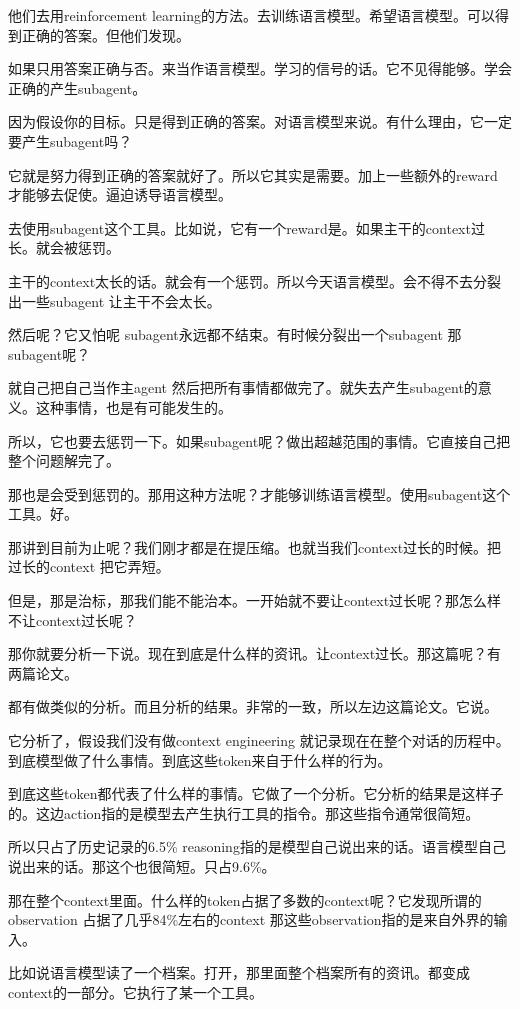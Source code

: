 \documentclass[12pt,a4paper]{article}
\begin{document}
他们去用reinforcement learning的方法。去训练语言模型。希望语言模型。可以得到正确的答案。但他们发现。

如果只用答案正确与否。来当作语言模型。学习的信号的话。它不见得能够。学会正确的产生subagent。

因为假设你的目标。只是得到正确的答案。对语言模型来说。有什么理由，它一定要产生subagent吗？

它就是努力得到正确的答案就好了。所以它其实是需要。加上一些额外的reward 才能够去促使。逼迫诱导语言模型。

去使用subagent这个工具。比如说，它有一个reward是。如果主干的context过长。就会被惩罚。

主干的context太长的话。就会有一个惩罚。所以今天语言模型。会不得不去分裂出一些subagent 让主干不会太长。

然后呢？它又怕呢 subagent永远都不结束。有时候分裂出一个subagent 那subagent呢？

就自己把自己当作主agent 然后把所有事情都做完了。就失去产生subagent的意义。这种事情，也是有可能发生的。

所以，它也要去惩罚一下。如果subagent呢？做出超越范围的事情。它直接自己把整个问题解完了。

那也是会受到惩罚的。那用这种方法呢？才能够训练语言模型。使用subagent这个工具。好。

那讲到目前为止呢？我们刚才都是在提压缩。也就当我们context过长的时候。把过长的context 把它弄短。

但是，那是治标，那我们能不能治本。一开始就不要让context过长呢？那怎么样不让context过长呢？

那你就要分析一下说。现在到底是什么样的资讯。让context过长。那这篇呢？有两篇论文。

都有做类似的分析。而且分析的结果。非常的一致，所以左边这篇论文。它说。

它分析了，假设我们没有做context engineering 就记录现在在整个对话的历程中。到底模型做了什么事情。到底这些token来自于什么样的行为。

到底这些token都代表了什么样的事情。它做了一个分析。它分析的结果是这样子的。这边action指的是模型去产生执行工具的指令。那这些指令通常很简短。

所以只占了历史记录的6.5\% reasoning指的是模型自己说出来的话。语言模型自己说出来的话。那这个也很简短。只占9.6\%。

那在整个context里面。什么样的token占据了多数的context呢？它发现所谓的observation 占据了几乎84\%左右的context 那这些observation指的是来自外界的输入。

比如说语言模型读了一个档案。打开，那里面整个档案所有的资讯。都变成context的一部分。它执行了某一个工具。
\end{document}
